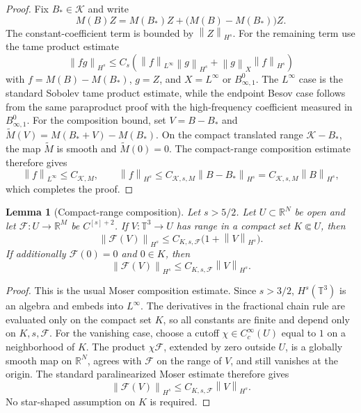 \documentclass[11pt]{article}
\numberwithin{equation}{section}
\newtheorem{lemma}[theorem]{Lemma}
\newcommand{\T}{\mathbb T}
\newcommand{\R}{\mathbb R}
\newcommand{\norm}[1]{\left\lVert #1\right\rVert}
\begin{document}
\begin{proof}
Fix \(B_*\in\mathcal K\) and write
\[
  M(B)Z=M(B_*)Z+\bigl(M(B)-M(B_*)\bigr)Z .
\]
The constant-coefficient term is bounded by \(\norm{Z}_{H^s}\).  For the
remaining term use the tame product estimate
\[
  \norm{fg}_{H^s}
  \le C_s\left(
  \norm{f}_{L^\infty}\norm{g}_{H^s}
  +\norm{g}_{X}\norm{f}_{H^s}
  \right)
\]
with \(f=M(B)-M(B_*)\), \(g=Z\), and
\(X=L^\infty\) or \(B^0_{\infty,1}\).  The \(L^\infty\) case is the standard
Sobolev tame product estimate, while the endpoint Besov case follows from the
same paraproduct proof with the high-frequency coefficient measured in
\(B^0_{\infty,1}\).
For the composition bound, set \(V=B-B_*\) and
\(\widetilde M(V)=M(B_*+V)-M(B_*)\).  On the compact translated range
\(\mathcal K-B_*\), the map \(\widetilde M\) is smooth and
\(\widetilde M(0)=0\).  The compact-range composition estimate therefore gives
\[
  \norm{f}_{L^\infty}\le C_{\mathcal K,M},
  \qquad
  \norm{f}_{H^s}\le C_{\mathcal K,s,M}\norm{B-B_*}_{H^s}
  = C_{\mathcal K,s,M}\norm{B}_{H^s},
\]
which completes the proof.
\end{proof}

\begin{lemma}[Compact-range composition]
\label{lem:appendix-composition}
Let \(s>5/2\).  Let \(U\subset\R^N\) be open and let
\(\mathcal F:U\to\R^M\) be \(C^{[s]+2}\).  If \(V:\T^3\to U\) has range in a
compact set \(K\Subset U\), then
\[
  \norm{\mathcal F(V)}_{H^s}
  \le
  C_{K,s,\mathcal F}\bigl(1+\norm{V}_{H^s}\bigr).
\]
If additionally \(\mathcal F(0)=0\) and \(0\in K\), then
\[
  \norm{\mathcal F(V)}_{H^s}
  \le
  C_{K,s,\mathcal F}\norm{V}_{H^s}.
\]
\end{lemma}

\begin{proof}
This is the usual Moser composition estimate.  Since \(s>3/2\), \(H^s(\T^3)\)
is an algebra and embeds into \(L^\infty\).  The derivatives in the fractional
chain rule are evaluated only on the compact set \(K\), so all constants are
finite and depend only on \(K,s,\mathcal F\).  For the vanishing case, choose
a cutoff \(\chi\in C_c^\infty(U)\) equal to \(1\) on a neighborhood of \(K\).
The product \(\chi\mathcal F\), extended by zero outside \(U\), is a globally
smooth map on \(\R^N\), agrees with \(\mathcal F\) on the range of \(V\), and
still vanishes at the origin.  The standard paralinearized Moser estimate
therefore gives
\[
  \norm{\mathcal F(V)}_{H^s}
  \le
  C_{K,s,\mathcal F}\norm{V}_{H^s}.
\]
No star-shaped assumption on \(K\) is required.
\end{proof}
\end{document}
